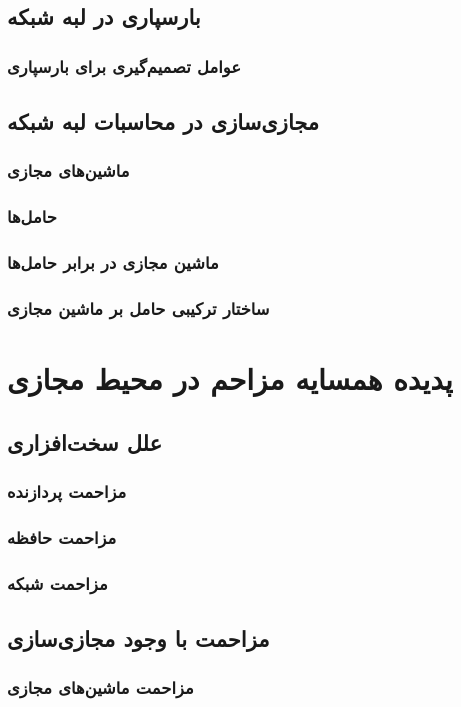 \subsection{بارسپاری در لبه شبکه}
\subsubsection{عوامل تصمیم‌گیری برای بارسپاری}
\subsection{مجازی‌سازی در محاسبات لبه شبکه}
\subsubsection{ماشین‌های مجازی}
\subsubsection{حامل‌ها}
\subsubsection{ماشین مجازی در برابر حامل‌ها}
\subsubsection{ساختار ترکیبی حامل بر ماشین مجازی}

\section{پدیده همسایه مزاحم در محیط مجازی}
\subsection{علل سخت‌افزاری}
\subsubsection{مزاحمت پردازنده}
\subsubsection{مزاحمت حافظه}
\subsubsection{مزاحمت شبکه}
\subsection{مزاحمت با وجود مجازی‌سازی}
\subsubsection{مزاحمت ماشین‌های مجازی}
